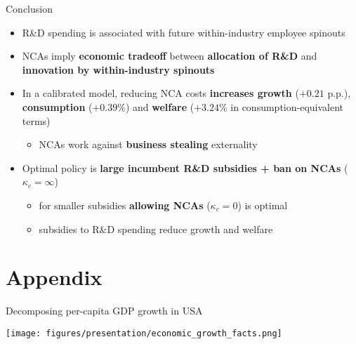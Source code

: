 \documentclass[english,usenames,dvipsnames]{beamer}
\begin{document}
\begin{frame}{Conclusion}
	\begin{itemize}
		\item R\&D spending is associated with future within-industry employee spinouts
		\medskip
		\item NCAs imply \alert{\textbf{economic tradeoff}} between \alert{\textbf{allocation of R\&D}} and \alert{\textbf{innovation by within-industry spinouts}}
		\medskip
		\item In a calibrated model, reducing NCA costs \alert{\textbf{increases growth }} ($+0.21$ p.p.), \alert{\textbf{consumption}} ($+0.39\%$) and \alert{\textbf{welfare}} ($+3.24\%$ in consumption-equivalent terms)
		\begin{itemize}
			\item NCAs work against \alert{\textbf{business stealing}} externality
		\end{itemize}
		\medskip
		\item Optimal policy is \alert{\textbf{large incumbent R\&D subsidies + ban on NCAs}} ($\kappa_c = \infty$)
		\begin{itemize}
			\item for smaller subsidies \alert{\textbf{allowing NCAs}} ($\kappa_c = 0$) is optimal
			\item subsidies to R\&D spending reduce growth and welfare
		\end{itemize}
	\end{itemize}
\end{frame}

\appendix

\section{Appendix}

\begin{frame}{Decomposing per-capita GDP growth in USA}\label{economic_growth_facts}\hyperlink{motivation_background}{}
	\begin{table}
		\texttt{[image: figures/presentation/economic\_growth\_facts.png]}
		\caption{Growth accounting (from Jones 2016, "The Facts of Economic Growth")}
	\end{table}
\end{frame}
\end{document}
